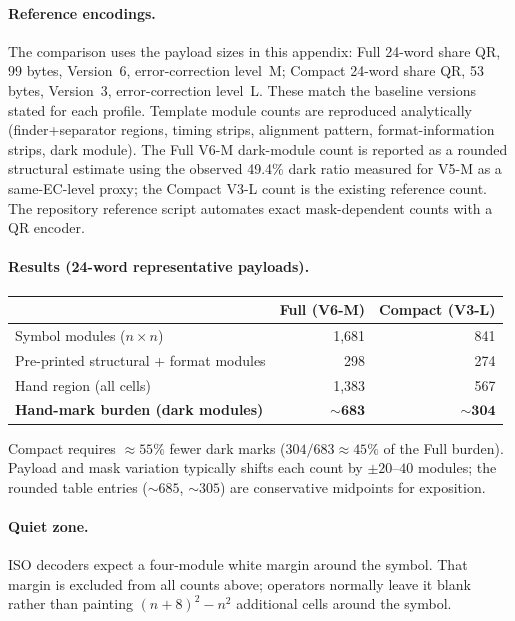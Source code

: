 \documentclass[11pt]{article}
\begin{document}
\paragraph{Reference encodings.} The comparison uses the payload sizes in this appendix: Full 24-word share QR, 99 bytes, Version~6, error-correction level~M; Compact 24-word share QR, 53 bytes, Version~3, error-correction level~L. These match the baseline versions stated for each profile. Template module counts are reproduced analytically (finder+separator regions, timing strips, alignment pattern, format-information strips, dark module). The Full V6-M dark-module count is reported as a rounded structural estimate using the observed 49.4\% dark ratio measured for V5-M as a same-EC-level proxy; the Compact V3-L count is the existing reference count. The repository reference script automates exact mask-dependent counts with a QR encoder.

\paragraph{Results (24-word representative payloads).}
\begin{center}
\small
\begin{tabular}{@{}lrr@{}}
\toprule
 & \textbf{Full (V6-M)} & \textbf{Compact (V3-L)} \\ \midrule
Symbol modules ($n\times n$) & 1,681 & 841 \\
Pre-printed structural + format modules & 298 & 274 \\
Hand region (all cells) & 1,383 & 567 \\
\textbf{Hand-mark burden (dark modules)} & ${\sim}\mathbf{683}$ & ${\sim}\mathbf{304}$ \\
\bottomrule
\end{tabular}
\end{center}
Compact requires ${\approx}55\%$ fewer dark marks ($304/683 \approx 45\%$ of the Full burden). Payload and mask variation typically shifts each count by $\pm 20$--$40$ modules; the rounded table entries (${\sim}685$, ${\sim}305$) are conservative midpoints for exposition.

\paragraph{Quiet zone.} ISO decoders expect a four-module white margin around the symbol. That margin is excluded from all counts above; operators normally leave it blank rather than painting $(n+8)^2 - n^2$ additional cells around the symbol.
\end{document}
